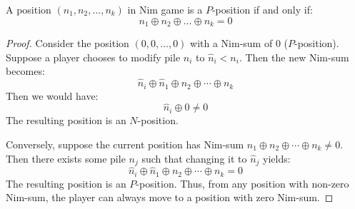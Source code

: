 \begin{theorem}[Bouton]
    A position $(n_1, n_2, \dots, n_k)$ in Nim game is a $P$-position if and only if:
    \[n_1 \oplus n_2 \oplus \dots \oplus n_k = 0\]
\end{theorem}
\begin{proof}
    Consider the position $(0, 0, \dots , 0)$ with a Nim-sum of 0 ($P$-position).
    Suppose a player chooses to modify pile $n_i$ to $\hat{n}_i<n_i$.
    Then the new Nim-sum becomes:
    \[\hat{n}_i \oplus \hat{n}_1 \oplus n_2 \oplus \cdots \oplus n_k\]
    Then we would have:
    \[\hat{n}_i \oplus 0 \neq 0\]
    The resulting position is an $N$-position.
    
    Conversely, suppose the current position has Nim-sum $n_1 \oplus n_2 \oplus \cdots \oplus n_k \neq 0$.  
    Then there exists some pile $n_j$ such that changing it to $\hat{n}_j$ yields:
    \[\hat{n}_i \oplus \hat{n}_1 \oplus n_2 \oplus \cdots \oplus n_k = 0\]
    The resulting position is an $P$-position.
    Thus, from any position with non-zero Nim-sum, the player can always move to a position with zero Nim-sum.
\end{proof}